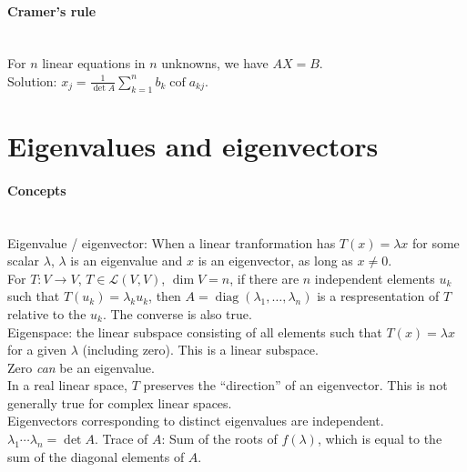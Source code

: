 \documentclass[10pt]{article}
\DeclareMathOperator{\cof}{cof}
\DeclareMathOperator{\diag}{diag}
\begin{document}
\paragraph{Cramer's rule}\ \\
For $n$ linear equations in $n$ unknowns, we have $AX = B$.\\
Solution: $x_j = \frac{1}{\det A} \sum_{k=1}^n b_k \cof a_{kj}$.



\bigskip\bigskip
\section{Eigenvalues and eigenvectors}\smallskip

\paragraph{Concepts}\ \\
Eigenvalue / eigenvector: When a linear tranformation has $T(x) = \lambda x$ for some scalar $\lambda$,
$\lambda$ is an eigenvalue and $x$ is an eigenvector, as long as $x \neq 0$.\\
For $T: V \to V$, $T \in {\mathscr L}(V, V)$, $\dim V = n$, if there are $n$ independent elements $u_k$
such that $T(u_k) = \lambda_k u_k$, then $A = \diag(\lambda_1, \dotsc, \lambda_n)$ is a respresentation
of $T$ relative to the $u_k$. The converse is also true.\\
Eigenspace: the linear subspace consisting of all elements such that $T(x) = \lambda x$ for a given $\lambda$
(including zero).  This is a linear subspace.\\
Zero {\it can} be an eigenvalue.\\
In a real linear space, $T$ preserves the ``direction'' of an eigenvector.  This is not generally true for 
complex linear spaces.\\
Eigenvectors corresponding to distinct eigenvalues are independent.\\
$\lambda_1 \dotsm \lambda_n = \det A$.
Trace of $A$: Sum of the roots of $f(\lambda)$, which is equal to the sum of the diagonal elements of $A$.
\end{document}
